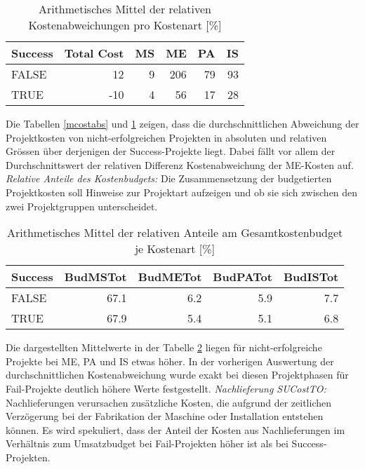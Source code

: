 \begin{table}[H]
	\centering
	\caption{Arithmetisches Mittel der relativen Kostenabweichungen pro Kostenart [\%]}
	\begin{tabular}{lrrrrr}
		\textbf{Success} & \multicolumn{1}{l}{\textbf{Total Cost}} & \multicolumn{1}{l}{\textbf{MS}} & \multicolumn{1}{l}{\textbf{ME}} & \multicolumn{1}{l}{\textbf{PA}} & \multicolumn{1}{l}{\textbf{IS}}
		\\\hline
		FALSE & 12    & 9     & 206   & 79    & 93 \\
		TRUE  & -10   & 4     & 56    & 17    & 28 \\
	\end{tabular}%
	\label{mcostrel}%
\end{table}%
Die Tabellen \ref{mcostabs} und \ref{mcostrel} zeigen, dass die durchschnittlichen Abweichung der Projektkosten von nicht-erfolgreichen Projekten in absoluten und relativen Grössen über derjenigen der Success-Projekte liegt. Dabei fällt vor allem der Durchschnittswert der relativen Differenz Kostenabweichung der ME-Kosten auf.
\newline\newline\textit{Relative Anteile des Kostenbudgets:} Die Zusammensetzung der budgetierten Projektkosten soll Hinweise zur Projektart aufzeigen und ob sie sich zwischen den zwei Projektgruppen unterscheidet.
\begin{table}[htbp]
	\centering
	\caption{Arithmetisches Mittel der relativen Anteile am Gesamtkostenbudget je Kostenart [\%]}
	\begin{tabular}{lrrrr}
		\textbf{Success} & \multicolumn{1}{l}{\textbf{BudMSTot}} & \multicolumn{1}{l}{\textbf{BudMETot}} & \multicolumn{1}{l}{\textbf{BudPATot}} & \multicolumn{1}{l}{\textbf{BudISTot}} \\\hline
		FALSE & 67.1  & 6.2   & 5.9   & 7.7 \\
		TRUE  & 67.9  & 5.4   & 5.1   & 6.8 \\
	\end{tabular}%
	\label{mbudtot}%
\end{table}%
Die dargestellten Mittelwerte in der Tabelle \ref{mbudtot} liegen für nicht-erfolgreiche Projekte bei ME, PA und IS etwas höher. In der vorherigen Auswertung der durchschnittlichen Kostenabweichung wurde exakt bei diesen Projektphasen für Fail-Projekte deutlich höhere Werte festgestellt.
%
%
\newline\newline\textit{Nachlieferung SUCostTO:} Nachlieferungen verursachen zusätzliche Kosten, die aufgrund der zeitlichen Verzögerung bei der Fabrikation der Maschine oder Installation entstehen können. Es wird spekuliert, dass der Anteil der Kosten aus Nachlieferungen im Verhältnis zum Umsatzbudget bei Fail-Projekten höher ist als bei Success-Projekten.
